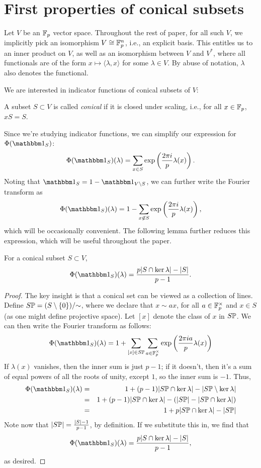 \section{First properties of conical subsets}\label{sec:part0}

Let $V$ be an $\F_p$ vector space.
Throughout the rest of paper, for all such $V$, we implicitly pick an isomorphism 
	$V\cong\F_p^n$, i.e., an explicit basis. This
	entitles us to an inner product on $V$, as well as an isomorphism between $V$ and
	$V^*$, where all functionals are of the form $x \mapsto \langle \lambda, x \rangle$
	for some $\lambda\in V$. By abuse of notation, $\lambda$ also denotes the functional.

We are interested in indicator functions of conical subsets of $V$:
\begin{defn}
    A subset $S\subset V$ is called \emph{conical} if it is closed under scaling,
    i.e., for all $x\in \F_p$, $xS = S$.    
\end{defn}
Since we're studying indicator functions, we can simplify our expression for 
$\Phi(\IND_S)$:
\[ \Phi(\IND_S)(\lambda) = \sum_{x\in S} \exp \left(\frac{2\pi i}{p} \lambda(x)\right). \]
Noting that $\IND_S = 1 - \IND_{V\setminus S}$, we can further write the Fourier transform as
\[ \Phi(\IND_S)(\lambda) = 1 - \sum_{x\not\in S} \exp \left(\frac{2\pi i}{p} \lambda(x)\right), \]
which will be occasionally convenient. The following lemma further reduces this expression,
which will be useful throughout the paper.
\begin{lem}\label{lem:FT-conical-subset}
	For a conical subset $S \subset V$,
	\[ \Phi(\IND_S)(\lambda) = \frac{p|S \cap \ker \lambda| - |S|}{p-1}. \]
	\begin{proof}
	   The key insight is that a conical set can be viewed as a collection of lines.
	   Define $S\P = (S\setminus\{0\}) / {\sim}$, where we declare that 
	   $x \sim a x$, for all $a\in\F_p^\times$ and
	   $x\in S$ (as one might define projective space). Let $[x]$ denote the class
	   of $x$ in $S\P$. We can then write the Fourier transform as follows:
	   \[ \Phi(\IND_S)(\lambda) = 
	           1 + \sum_{[x]\in S\P} 
	               \sum_{a\in\F_p^\times} \exp \left(\frac{2\pi i a}{p} \lambda(x)\right) \]
	   If $\lambda(x)$ vanishes, then the inner sum is just $p-1$; if it doesn't, then it's
	   a sum of equal powers of all the roots of unity, except $1$, so the inner sum is $-1$.
	   Thus,
	   \begin{eqnarray*}
	       \Phi(\IND_S)(\lambda)
	       &=& 1 + 
	           (p-1)|S\P \cap \ker \lambda| - 
	           |S\P \setminus \ker\lambda| \\
	       &=& 1 + 
	           (p-1)|S\P \cap \ker \lambda| - 
	           (|S\P| - |S\P \cap \ker\lambda|) \\
	       &=& 1 + 
	           p|S\P \cap \ker \lambda| - |S\P|
	   \end{eqnarray*}
	   Note now that $|S\P| = \frac{|S| - 1}{p-1}$, by definition. If we substitute
	   this in, we find that 
	   \[ \Phi(\IND_S)(\lambda) = \frac{p|S \cap \ker \lambda| - |S|}{p-1}, \]
	   as desired.
	\end{proof}
\end{lem}

